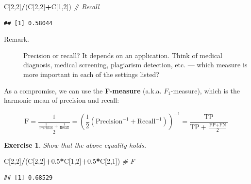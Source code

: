 \documentclass[10pt,b5paper,krantz1]{krantz}
\newenvironment{Shaded}{\begin{snugshade}}{\end{snugshade}}
\newcommand{\CommentTok}[1]{\textcolor[rgb]{0.37,0.37,0.37}{\textit{#1}}}
\newcommand{\DecValTok}[1]{\textcolor[rgb]{0.06,0.06,0.06}{#1}}
\newcommand{\FloatTok}[1]{\textcolor[rgb]{0.06,0.06,0.06}{#1}}
\newcommand{\NormalTok}[1]{#1}
\newcommand{\OperatorTok}[1]{\textcolor[rgb]{0.43,0.43,0.43}{\textbf{#1}}}
\newtheorem{exercise}{Exercise}[chapter]
\begin{document}
\begin{Shaded}
\begin{Highlighting}[]
\NormalTok{C[}\DecValTok{2}\NormalTok{,}\DecValTok{2}\NormalTok{]}\OperatorTok{/}\NormalTok{(C[}\DecValTok{2}\NormalTok{,}\DecValTok{2}\NormalTok{]}\OperatorTok{+}\NormalTok{C[}\DecValTok{1}\NormalTok{,}\DecValTok{2}\NormalTok{]) }\CommentTok{# Recall}
\end{Highlighting}
\end{Shaded}

\begin{verbatim}
## [1] 0.58044
\end{verbatim}

\begin{description}
\item[Remark.]
Precision or recall? It depends on an application.
Think of medical diagnosis, medical screening, plagiarism detection,
etc. --- which measure is more important in each of the settings listed?
\end{description}

As a compromise, we can use the \textbf{F-measure}
(a.k.a. \(F_1\)-measure),
which is the harmonic mean of precision
and recall:

\[
\text{F} = \frac{1}{
    \frac{
        \frac{1}{\text{Precision}}+\frac{1}{\text{Recall}}
    }{2}
}
=
\left(
\frac{1}{2}
\left(
\text{Precision}^{-1}+\text{Recall}^{-1}
\right)
\right)^{-1}
=
\frac{\text{TP}}{\text{TP} + \frac{\text{FP} + \text{FN}}{2}}
\]

\begin{exercise}

Show that the above equality holds.

\end{exercise}

\begin{Shaded}
\begin{Highlighting}[]
\NormalTok{C[}\DecValTok{2}\NormalTok{,}\DecValTok{2}\NormalTok{]}\OperatorTok{/}\NormalTok{(C[}\DecValTok{2}\NormalTok{,}\DecValTok{2}\NormalTok{]}\OperatorTok{+}\FloatTok{0.5}\OperatorTok{*}\NormalTok{C[}\DecValTok{1}\NormalTok{,}\DecValTok{2}\NormalTok{]}\OperatorTok{+}\FloatTok{0.5}\OperatorTok{*}\NormalTok{C[}\DecValTok{2}\NormalTok{,}\DecValTok{1}\NormalTok{]) }\CommentTok{# F}
\end{Highlighting}
\end{Shaded}

\begin{verbatim}
## [1] 0.68529
\end{verbatim}
\end{document}
